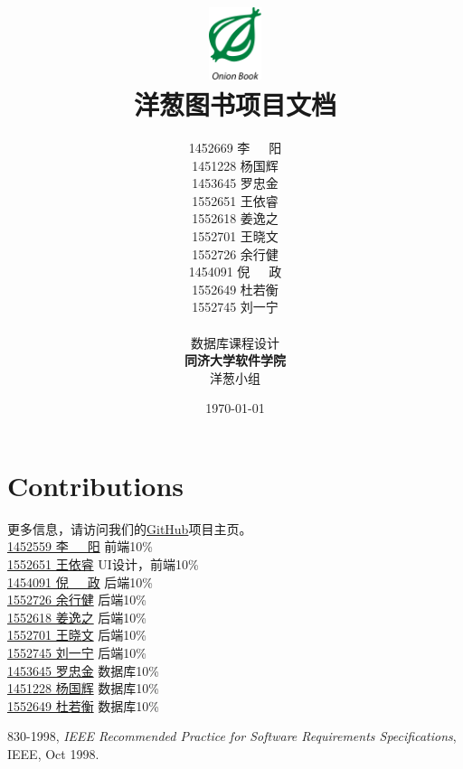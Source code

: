 \documentclass[12pt]{scrreprt}
\title{
	\includegraphics[width=0.6in]{Res/DocumentRes/OnionBook.png} \\
	\vspace*{0.3in}
	\textbf{洋葱图书项目文档}
}
\author{1452669 李\ \ \ 阳\\
		1451228 杨国辉\\
		1453645 罗忠金\\
		1552651 王依睿\\
		1552618 姜逸之\\
		1552701 王晓文\\
		1552726 余行健\\
		1454091 倪\ \ \ 政\\
		1552649 杜若衡\\
		1552745 刘一宁\\
	    \vspace*{0.2in} \\
	    数据库课程设计\\
    	\textbf{同济大学软件学院}\\
    	洋葱小组\\
}
\date{\today}
\begin{document}


\maketitle
\tableofcontents

\chapter{Contributions}
更多信息，请访问我们的\href{https://github.com/zjzsliyang/OnionExpress}{\color{blue}GitHub}项目主页。
\vspace{3mm}\\
\href{https://github.com/zjzsliyang}{{\color{blue}1452559 李\ \ \ 阳}} \hspace{17mm} 前端\hfill 10\%\\
\href{https://github.com/Charon0622}{{\color{blue}1552651 王依睿}} \hspace{17mm} UI设计，前端\hfill 10\%\\
\href{https://github.com/frank1129}{{\color{blue}1454091 倪\ \ \ 政}} \hspace{17mm} 后端\hfill 10\%\\
\href{https://github.com/ThomasFisher196}{{\color{blue}1552726 余行健}} \hspace{17mm} 后端\hfill 10\%\\
\href{https://github.com/Ginufet}{{\color{blue}1552618 姜逸之}} \hspace{17mm} 后端\hfill 10\%\\
\href{https://github.com/WANGXiaowen0904}{{\color{blue}1552701 王晓文}} \hspace{17mm} 后端\hfill 10\%\\
\href{https://github.com/Eclear}{{\color{blue}1552745 刘一宁}} \hspace{17mm} 后端\hfill 10\%\\
\href{https://github.com/tjluozhongjin}{{\color{blue}1453645 罗忠金}} \hspace{17mm} 数据库\hfill 10\%\\
\href{https://github.com/Yghifi}{{\color{blue}1451228 杨国辉}} \hspace{17mm} 数据库\hfill 10\%\\
\href{https://github.com/Wortspieldrh}{{\color{blue}1552649 杜若衡}} \hspace{17mm} 数据库\hfill 10\%\\


\begin{thebibliography}{99}
  830-1998,
  \emph{IEEE Recommended Practice for Software Requirements Specifications},
  IEEE,
  Oct 1998.
\end{thebibliography}
\end{document}
